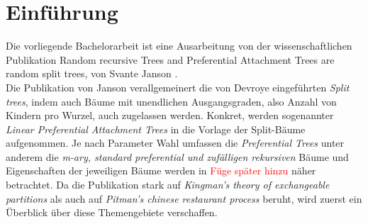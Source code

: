 \chapter{Einführung}
Die vorliegende Bachelorarbeit ist eine Ausarbeitung von der wissenschaftlichen Publikation \glqq Random recursive Trees and Preferential Attachment Trees are random split trees\grqq, von Svante Janson \cite{janson2019random}.\\
Die Publikation von Janson verallgemeinert die von Devroye \cite{devroye1998universal} eingeführten \textit{Split trees}, indem auch Bäume mit unendlichen Ausgangsgraden, also Anzahl von Kindern pro Wurzel, auch zugelassen werden. Konkret, werden sogenannter \textit{Linear Preferential Attachment Trees} in die Vorlage der Split-Bäume aufgenommen. Je nach Parameter Wahl umfassen die \textit{Preferential Trees} unter anderem die \textit{m-ary, standard preferential und zufälligen rekursiven} Bäume und Eigenschaften der jeweiligen Bäume werden in \textcolor{red}{Füge später hinzu} näher betrachtet. Da die Publikation stark auf \textit{Kingman's theory of exchangeable partitions} \cite{kingman1978representation,kingman1982coalescent} als auch auf \textit{Pitman's chinese restaurant process} \cite{pitman2006combinatorial,pitman1995exchangeable} beruht, wird zuerst ein Überblick über diese Themengebiete verschaffen.
